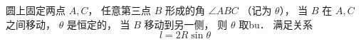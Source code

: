 
\begin{issues}
\issueDraft
\end{issues}

圆上固定两点 $A,C$， 任意第三点 $B$ 形成的角 $\angle ABC$ （记为 $\theta$）， 当 $B$ 在 $A,C$ 之间移动， $\theta$ 是恒定的， 当 $B$ 移动到另一侧， 则 $\theta$ 取bu． 满足关系
\begin{equation}
l = 2R\sin\theta
\end{equation}
